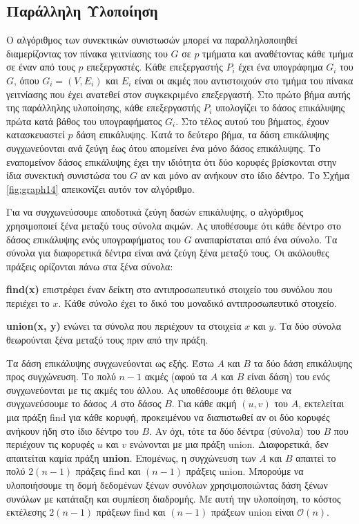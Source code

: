 \documentclass[12pt,a4paper]{article}
\begin{document}
\subsection*{Παράλληλη Υλοποίηση}

Ο αλγόριθμος των συνεκτικών συνιστωσών μπορεί να παραλληλοποιηθεί
διαμερίζοντας τον πίνακα γειτνίασης του $G$ σε $p$ τμήματα και αναθέτοντας
κάθε τμήμα σε έναν από τους $p$ επεξεργαστές. Κάθε επεξεργαστής $P_i$ έχει
ένα υπογράφημα $G_i$ του $G$, όπου $G_i = (V, E_i)$ και $E_i$ είναι οι ακμές
που αντιστοιχούν στο τμήμα του πίνακα γειτνίασης που έχει ανατεθεί στον
συγκεκριμένο επεξεργαστή. Στο πρώτο βήμα αυτής της παράλληλης υλοποίησης,
κάθε επεξεργαστής $P_i$ υπολογίζει το δάσος επικάλυψης πρώτα κατά βάθος του
υπογραφήματος $G_i$. Στο τέλος αυτού του βήματος, έχουν κατασκευαστεί $p$
δάση επικάλυψης. Κατά το δεύτερο βήμα, τα δάση επικάλυψης
συγχωνεύονται ανά ζεύγη έως ότου απομείνει ένα μόνο δάσος επικάλυψης.
Το εναπομείνον δάσος επικάλυψης έχει την ιδιότητα ότι δύο κορυφές
βρίσκονται στην ίδια συνεκτική συνιστώσα του $G$ αν και μόνο αν ανήκουν
στο ίδιο δέντρο. Το Σχήμα \ref{fig:graph14} απεικονίζει αυτόν τον αλγόριθμο.

Για να συγχωνεύσουμε αποδοτικά ζεύγη δασών επικάλυψης, ο αλγόριθμος
χρησιμοποιεί ξένα μεταξύ τους σύνολα ακμών. Ας υποθέσουμε ότι κάθε
δέντρο στο δάσος επικάλυψης ενός υπογραφήματος του $G$ αναπαρίσταται από
ένα σύνολο. Τα σύνολα για διαφορετικά δέντρα είναι ανά ζεύγη ξένα
μεταξύ τους. Οι ακόλουθες πράξεις ορίζονται πάνω στα ξένα σύνολα:

\vspace{0.3cm}
\textbf{\foreignlanguage{english}{find(x)}} επιστρέφει έναν δείκτη στο αντιπροσωπευτικό στοιχείο
του συνόλου που περιέχει το $x$. Κάθε σύνολο έχει το δικό του μοναδικό
αντιπροσωπευτικό στοιχείο.

\textbf{\foreignlanguage{english}{union(x, y)}} ενώνει τα σύνολα που περιέχουν τα στοιχεία $x$ και
$y$. Τα δύο σύνολα θεωρούνται ξένα μεταξύ τους πριν από την πράξη.

\vspace{0.3cm}
Τα δάση επικάλυψης συγχωνεύονται ως εξής. Έστω $A$ και $B$ τα δύο
δάση επικάλυψης προς συγχώνευση. Το πολύ $n - 1$ ακμές (αφού τα $A$
και $B$ είναι δάση) του ενός συγχωνεύονται με τις ακμές του άλλου.
Ας υποθέσουμε ότι θέλουμε να συγχωνεύσουμε το δάσος $A$ στο δάσος $B$.
Για κάθε ακμή $(u, v)$ του $A$, εκτελείται μια πράξη \foreignlanguage{english}{find} για
κάθε κορυφή, προκειμένου να διαπιστωθεί αν οι δύο κορυφές ανήκουν ήδη
στο ίδιο δέντρο του $B$. Αν όχι, τότε τα δύο δέντρα (σύνολα) του $B$
που περιέχουν τις κορυφές $u$ και $v$ ενώνονται με μια πράξη
\foreignlanguage{english}{union}. Διαφορετικά, δεν απαιτείται καμία πράξη \textbf{\foreignlanguage{english}{union}}.
Επομένως, η συγχώνευση των $A$ και $B$ απαιτεί το πολύ $2(n - 1)$
πράξεις \foreignlanguage{english}{find} και $(n - 1)$ πράξεις \foreignlanguage{english}{union}. Μπορούμε
να υλοποιήσουμε τη δομή δεδομένων ξένων συνόλων χρησιμοποιώντας δάση ξένων συνόλων με κατάταξη και
συμπίεση διαδρομής. Με αυτή την υλοποίηση, το κόστος εκτέλεσης
$2(n - 1)$ πράξεων \foreignlanguage{english}{find} και $(n - 1)$ πράξεων \foreignlanguage{english}{union}
είναι $\mathcal{O}(n)$.
\end{document}
